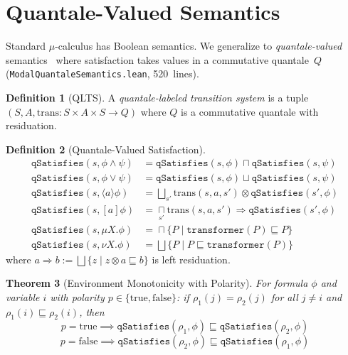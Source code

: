\documentclass[11pt]{article}
\newtheorem{theorem}{Theorem}[section]
\theoremstyle{definition}
\newtheorem{definition}[theorem]{Definition}
\theoremstyle{remark}
\providecommand{\bigsqcap}{\mathop{\textstyle\sqcap}\limits}
\begin{document}
\section{Quantale-Valued Semantics}
\label{sec:quantale}

Standard $\mu$-calculus has Boolean semantics.  We generalize to
\emph{quantale-valued} semantics~\cite{Kozen1983} where satisfaction
takes values in a commutative quantale~$Q$
(\texttt{ModalQuantaleSemantics.lean}, 520~lines).

\begin{definition}[QLTS]
A \emph{quantale-labeled transition system} is a tuple
$(S, A, \mathrm{trans} : S \times A \times S \to Q)$ where $Q$ is a
commutative quantale with residuation.
\end{definition}

\begin{definition}[Quantale-Valued Satisfaction]
\begin{align*}
\texttt{qSatisfies}(s, \phi \land \psi) &= \texttt{qSatisfies}(s, \phi) \sqcap \texttt{qSatisfies}(s, \psi) \\
\texttt{qSatisfies}(s, \phi \lor \psi) &= \texttt{qSatisfies}(s, \phi) \sqcup \texttt{qSatisfies}(s, \psi) \\
\texttt{qSatisfies}(s, \langle a \rangle \phi) &= \bigsqcup_{s'} \mathrm{trans}(s, a, s') \otimes \texttt{qSatisfies}(s', \phi) \\
\texttt{qSatisfies}(s, [a] \phi) &= \bigsqcap_{s'} \mathrm{trans}(s, a, s') \Rightarrow \texttt{qSatisfies}(s', \phi) \\
\texttt{qSatisfies}(s, \mu X.\phi) &= \bigsqcap \{P \mid \texttt{transformer}(P) \sqsubseteq P\} \\
\texttt{qSatisfies}(s, \nu X.\phi) &= \bigsqcup \{P \mid P \sqsubseteq \texttt{transformer}(P)\}
\end{align*}
where $a \Rightarrow b := \bigsqcup\{z \mid z \otimes a \sqsubseteq b\}$
is left residuation.
\end{definition}

\begin{theorem}[Environment Monotonicity with Polarity]
\label{thm:env-mono}
For formula $\phi$ and variable $i$ with polarity
$p \in \{\mathrm{true}, \mathrm{false}\}$:
if $\rho_1(j) = \rho_2(j)$ for all $j \neq i$ and
$\rho_1(i) \sqsubseteq \rho_2(i)$, then
\[
  p = \mathrm{true} \implies \texttt{qSatisfies}(\rho_1, \phi)
    \sqsubseteq \texttt{qSatisfies}(\rho_2, \phi)
\]
\[
  p = \mathrm{false} \implies \texttt{qSatisfies}(\rho_2, \phi)
    \sqsubseteq \texttt{qSatisfies}(\rho_1, \phi)
\]
\end{theorem}
\end{document}
